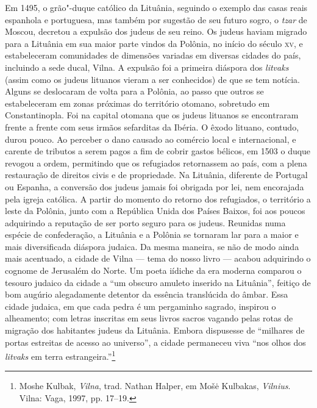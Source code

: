 Em 1495, o grão"-duque católico da Lituânia, seguindo o exemplo das casas
reais espanhola e portuguesa, mas também por sugestão de seu futuro
sogro, o \textit{tzar} de Moscou, decretou a expulsão dos judeus de seu reino. Os
judeus haviam migrado para a Lituânia em sua maior parte vindos da
Polônia, no início do século \textsc{xv}, e estabeleceram comunidades de
dimensões variadas em diversas cidades do país, incluindo a sede ducal,
Vilna. A expulsão foi a primeira diáspora dos \textit{litvaks} (assim como os
judeus lituanos vieram a ser conhecidos) de que se tem notícia. Alguns
se deslocaram de volta para a Polônia, ao passo que outros se
estabeleceram em zonas próximas do território otomano, sobretudo em
Constantinopla. Foi na capital otomana que os judeus lituanos se
encontraram frente a frente com seus irmãos sefarditas da Ibéria. O
êxodo lituano, contudo, durou pouco. Ao perceber o dano causado ao
comércio local e internacional, e carente de tributos a serem pagos a
fim de cobrir gastos bélicos, em 1503 o duque revogou a ordem,
permitindo que os refugiados retornassem ao país, com a plena
restauração de direitos civis e de propriedade. Na Lituânia, diferente
de Portugal ou Espanha, a conversão dos judeus jamais foi obrigada por
lei, nem encorajada pela igreja católica. A partir do momento do retorno
dos refugiados, o território a leste da Polônia, junto com a República
Unida dos Países Baixos, foi aos poucos adquirindo a reputação de ser
porto seguro para os judeus. Reunidas numa espécie de confederação, a
Lituânia e a Polônia se tornaram lar para a maior e mais diversificada
diáspora judaica. Da mesma maneira, se não de modo ainda mais acentuado,
a cidade de Vilna --- tema do nosso livro --- acabou adquirindo o cognome de
Jerusalém do Norte. Um poeta iídiche da era moderna comparou o tesouro
judaico da cidade a ``um obscuro amuleto inserido na Lituânia'', feitiço
de bom augúrio alegadamente detentor da essência translúcida do âmbar.
Essa cidade judaica, em que cada pedra é um pergaminho sagrado, inspirou
o alheamento; com letras inscritas em seus livros sacros vagando pelas
rotas de migração dos habitantes judeus da Lituânia. Embora dispusesse
de ``milhares de portas estreitas de acesso ao universo'', a cidade
permaneceu viva ``nos olhos dos \textit{litvaks} em terra
estrangeira.''\footnote{Moshe Kulbak, \textit{Vilna}, trad. Nathan
  Halper, em Mošė Kulbakas, \textit{Vilnius}. Vilna: Vaga, 1997, pp.
  17--19.}


